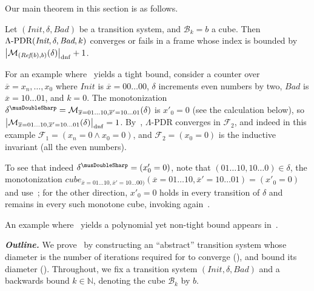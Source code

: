 \documentclass[acmsmall,screen]{acmart}
\newcommand{\para}[1]{\vspace{2pt}\noindent\textbf{\textit{#1.}}}
\newcommand{\ov}{\overline}
\newcommand{\card}[1]{{\left\vert{#1}\right\vert}} %
\newcommand{\Init}{{\textit{Init}}}
\newcommand{\Bad}{\textit{Bad}}
\newcommand{\tr}{\delta}
\newcommand{\Frame}{\mathcal{F}}
\renewcommand{\vec}{\ov}
\newcommand{\bkwrch}[1]{\mathcal{B}_{#1}}
\newcommand{\dnfsize}[1]{\card{#1}_{\rm dnf}}
\newcommand{\cubemon}[2]{\textit{cube}_{{#2}}({#1})}
\newcommand{\moncube}[2]{\cubemon{#1}{#2}}
\newcommand{\monox}[2]{\mathcal{M}_{#2}({#1})}
\newcommand{\absr}[1]{{#1}^{\musDoubleSharp}}
\newcommand{\eepdr}{\Lambda\mbox{\rm-PDR}}
\newcommand{\bkcube}{b}
\newcommand{\reflect}[1]{\textit{Ref}({#1})}
\begin{document}
Our main theorem in this section is as follows.
\begin{theorem}
\label{thm:abstract-diamter-bound}
Let $(\Init,\tr,\Bad)$ be a transition system, and $\bkwrch{k}=\bkcube$ a cube.
Then $\eepdr(\Init,\tr,\Bad,k)$ converges or fails in a frame whose index  is bounded by $\dnfsize{\monox{\tr}{(\reflect{\bkcube},\bkcube)}}+1$.
\end{theorem}
%

\begin{example}
\label{ex:even-counter-constant}
For an example where~ yields a tight bound, consider a counter over $\vec{x}=x_n,\ldots,x_0$ where $\Init$ is $\vec{x}=00\ldots00$, $\tr$ increments even numbers by two, $\Bad$ is $\vec{x}=10\ldots01$, and $k=0$.
The monotonization $\absr{\tr} = \monox{\tr}{\vec{x}=01\ldots10,\vec{x}'=10\ldots01}$ is $x'_0=0$ (see the calculation below), so $\dnfsize{\monox{\tr}{\vec{x}=01\ldots10,\vec{x}'=10\ldots01}}=1$. By~, $\Lambda$-PDR converges in $\Frame_2$, and indeed in this example $\Frame_1 = (x_n=0 \land x_0=0)$, and $\Frame_2 = (x_0=0)$ is the inductive invariant (all the even numbers).

To see that indeed $\absr{\tr} = (x'_0=0)$, note that $(01\ldots10,10\ldots0) \in \tr$, the monotonization $\moncube{\vec{x}=01\ldots10,\vec{x}'=10\ldots01}{\vec{x}=01\ldots10,\vec{x}'=10\ldots00)} = (x'_0=0)$ and use~; for the other direction, $x'_0=0$ holds in every transition of $\tr$ and remains in every such monotone cube, invoking again~.
\end{example}

\begin{example}
\label{ex:skip-counter-bounce-polynomial}
An example where~ yields a polynomial yet non-tight bound appears in~.
\end{example}

\para{Outline}
%
We prove~ by constructing an ``abstract'' transition system whose diameter is the number of iterations required for  to converge (), and bound its diameter %
().
Throughout, we fix a transition system $(\Init,\tr,\Bad)$ and a backwards bound $k \in \mathbb{N}$, denoting the cube $\bkwrch{k}$ by $\bkcube$.
\end{document}
